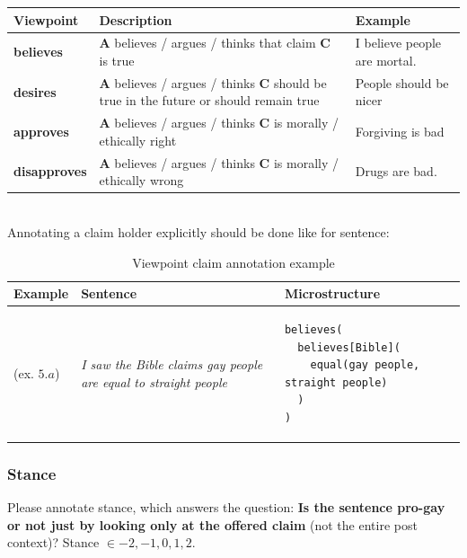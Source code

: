\begin{tabular}{l p{7cm} p{6cm}}
\toprule
Viewpoint & Description & Example \\
\midrule
\textbf{believes} & \textbf{A} believes / argues / thinks
that claim \textbf{C} is true & 
I believe people are mortal. \\
\midrule
\textbf{desires} & 
\textbf{A} believes / argues / thinks \textbf{C} 
should be true in the future or should remain true
& People should be nicer \\
\midrule
\textbf{approves} & 
\textbf{A} believes / argues / thinks \textbf{C} 
is morally / ethically right & Forgiving is bad \\
\midrule
\textbf{disapproves} & 
\textbf{A} believes / argues / thinks \textbf{C} 
is morally / ethically wrong & 
Drugs are bad.  \\
\bottomrule
\end{tabular} \\

\noindent Annotating a claim holder explicitly should be done like for sentence:

\begin{table}[h]
\begin{tabular}{@{}m{1.5cm} m{5cm} m{8cm}}
\toprule
Example & Sentence & Microstructure \\
\midrule
(ex. $5.a$) & \textit{I saw the Bible claims gay people are equal to straight people} & 
\begin{verbatim}
believes(
  believes[Bible](
    equal(gay people, straight people)
  )
)
\end{verbatim}
\\
\bottomrule
\end{tabular}
\label{tab:viewpoint_example}
\caption{Viewpoint claim annotation example}
\end{table}

\subsubsection{Stance}

Please annotate stance, which answers the question:
\textbf{Is the sentence pro-gay or not just by looking only at the offered claim} (not
the entire post context)? Stance $\in {-2, -1, 0, 1, 2}$.

